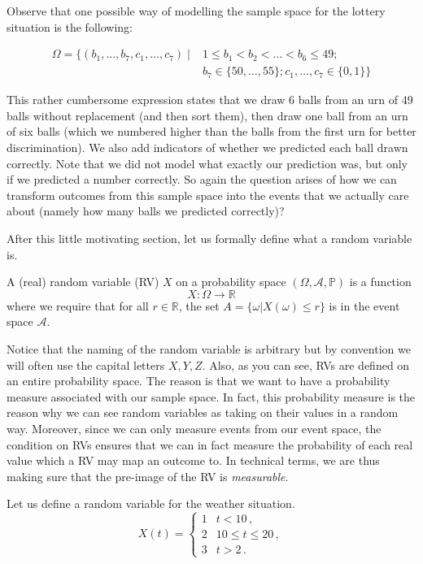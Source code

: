 \documentclass[a4paper,11pt,leqno]{report}
\begin{document}
Observe that one possible way of modelling the sample space for the lottery situation is the following:

\begin{align}
\Omega = \{(b_{1}, \ldots, b_{7}, c_{1}, \ldots, c_{7}) \mid &1 \leq b_{1} < b_2 < \ldots < b_{6} \leq 49;\\
&b_{7} \in \{50, \ldots, 55\}; c_{1}, \ldots, c_{7} \in \{0,1\} \} \nonumber
\end{align}

This rather cumbersome expression states that we draw 6 balls from an urn of 49 balls without replacement (and then sort them), then draw one ball from an urn of six balls (which we numbered higher than the balls from the first
urn for better discrimination). We also add indicators of whether we predicted each ball drawn correctly. Note that we did not model what exactly our prediction was, but only if we predicted a number correctly. So again the question arises of how we can transform outcomes from this sample space into
the events that we actually care about (namely how many balls we predicted correctly)?

\medskip
After this little motivating section, let us formally define what a random variable is.

\begin{Definition} 
A (real) random variable (RV) $X$ on a probability space $(\Omega, \mathcal{A}, \mathbb{P})$ is a function
$$ X: \Omega \rightarrow \mathbb{R} $$
where we require that for
all $ r \in \mathbb{R} $, the set $ A = \{\omega| X(\omega) \leq r\} $ is in the event space $ \mathcal{A}$.
\end{Definition}

Notice that the naming of the random variable is arbitrary but by convention we will often use the capital letters
$ X,Y,Z $. Also, as you can see, RVs are defined on an entire probability space. The reason is that
we want to have a probability measure associated with our sample space. 
In fact, this probability measure is the reason why we can see random variables as taking on their values
in a random way. Moreover, since we can only measure events from our event space, the condition on RVs
ensures that we can in fact measure the probability of each real value which a RV may map an outcome to.
In technical terms, we are thus making sure that the pre-image of the RV is \textit{measurable}.

Let us define a random variable for the weather situation. 
\begin{equation} \label{weatherRV}
X(t) = 
\begin{cases}
1 & t < 10 \, , \\
2 & 10 \leq t \leq 20 \, ,\\
3 & t > 2 \, .
\end{cases}
\end{equation}
\end{document}
